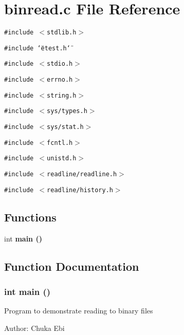 \section{binread.c File Reference}
\label{binread_8c}
{\tt \#include $<$stdlib.h$>$}\par
{\tt \#include \char`\"{}etest.h\char`\"{}}\par
{\tt \#include $<$stdio.h$>$}\par
{\tt \#include $<$errno.h$>$}\par
{\tt \#include $<$string.h$>$}\par
{\tt \#include $<$sys/types.h$>$}\par
{\tt \#include $<$sys/stat.h$>$}\par
{\tt \#include $<$fcntl.h$>$}\par
{\tt \#include $<$unistd.h$>$}\par
{\tt \#include $<$readline/readline.h$>$}\par
{\tt \#include $<$readline/history.h$>$}\par
\subsection*{Functions}
\begin{CompactItemize}
\item 
int \bf{main} ()
\end{CompactItemize}


\subsection{Function Documentation}
\subsubsection{\setlength{\rightskip}{0pt plus 5cm}int main ()}\label{binread_8c_e66f6b31b5ad750f1fe042a706a4e3d4}


Program to demonstrate reading to binary files \begin{Desc}
\item[Author:]Chuka Ebi \end{Desc}
